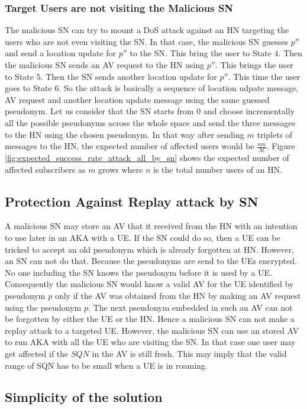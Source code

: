 \documentclass{llncs} %
\begin{document}
\subsubsection{Target Users are not visiting the Malicious SN} The malicious SN can try to mount a DoS attack against an HN targeting the users who are not even visiting the SN. In that case, the malicious SN guesses $p''$ and send a location update for $p''$ to the SN. This bring the user to State $4$. Then the malicious SN sends an AV request to the HN using $p''$. This brings the user to State $5$. Then the SN sends another location update for $p''$. This time the user goes to State $6$. So the attack is basically a sequence of location udpate message, AV request and another location update message using the same guessed pseudonym. Let us consider that the SN starts from $0$ and choose incrementally all the possible pseudonyms across the whole space and send the three messages to the HN using the chosen pseudonym. In that way after sending $m$ triplets of messages to the HN, the expected number of affected users would be $\frac{nm}{\mathcal{M}}$. Figure \ref{fig:expected_success_rate_attack_all_by_sn} shows the expected number of affected subscribers as $m$ grows where $n$ is the total number users of an HN.

\subsection{Protection Against Replay attack by SN}
A malicious SN may store an AV that it received from the HN with an intention to use later in an AKA with a UE. If the SN could do so, then a UE can be tricked to accept an old pseudonym which is already forgotten at HN. However, an SN can not do that. Because the pseudonyms are send to the UEs encrypted. No one including the SN knows the pseudonym before it is used by a UE. Consequently the malicious SN would know a valid AV for the UE identified by pseudonym $p$ only if the AV was obtained from the HN by making an AV request using the pseudonym $p$. The next pseudonym embedded in such an AV can not be forgotten by either the UE or the HN. Hence a malicious SN can not make a replay attack to a targeted UE. However, the malicious SN can use an stored AV to run AKA with all the UE who are visiting the SN. In that case one user may get affected if the $SQN$ in the AV is still fresh. This may imply that the valid range of SQN has to be small when a UE is in roaming.

\subsection{Simplicity of the solution}
\end{document}
